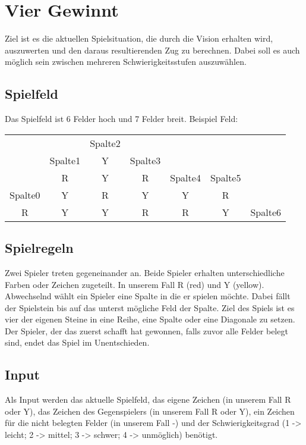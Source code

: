 \section{Vier Gewinnt}
Ziel ist es die aktuellen Spielsituation, die durch die Vision erhalten wird, auszuwerten und den daraus resultierenden Zug zu berechnen. Dabei soll es auch möglich sein zwischen mehreren Schwierigkeitsstufen auszuwählen.

\subsection{Spielfeld}
Das Spielfeld ist 6 Felder hoch und 7 Felder breit.
Beispiel Feld:

\begin{tabular}{| c|c|c|c|c|c|c|} \hline  
 & & & & & & \\ \hline  
 & & Spalte2& & & & \\ \hline  
 & Spalte1& Y& Spalte3& & & \\ \hline  
 & R& Y& R& Spalte4& Spalte5& \\ \hline  
 Spalte0& Y& R& Y& Y& R& \\ \hline  
 R& Y& Y& R& R& Y& Spalte6\\ \hline 
\end{tabular}

\subsection{Spielregeln}
Zwei Spieler treten gegeneinander an. Beide Spieler erhalten unterschiedliche Farben oder Zeichen zugeteilt. In unserem Fall R (red) und Y (yellow). Abwechselnd wählt ein Spieler eine Spalte in die er spielen möchte. Dabei fällt der Spielstein bis auf das unterst mögliche Feld der Spalte. Ziel des Spiels ist es vier der eigenen Steine in eine Reihe, eine Spalte oder eine Diagonale zu setzen. Der Spieler, der das zuerst schafft hat gewonnen, falls zuvor alle Felder belegt sind, endet das Spiel im Unentschieden. 

\subsection{Input}
Als Input werden das aktuelle Spielfeld, das eigene Zeichen (in unserem Fall R oder Y), das Zeichen des Gegenspielers (in unserem Fall R oder Y), ein Zeichen für die nicht belegten Felder (in unserem Fall -) und der Schwierigkeitsgrad  (1 -> leicht; 2 -> mittel; 3 -> schwer; 4 -> unmöglich) benötigt.

